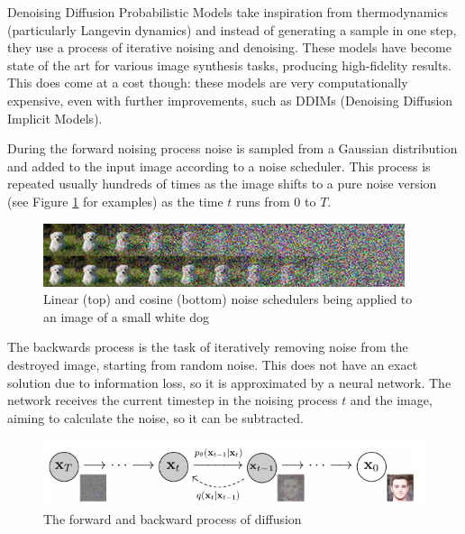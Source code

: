 	Denoising Diffusion Probabilistic Models take inspiration from thermodynamics (particularly Langevin dynamics\cite{welling2011bayesian}) and instead of generating a sample in one step, they use a process of iterative noising and denoising\cite{ho2020denoising}. These models have become state of the art for various image synthesis tasks, producing high-fidelity results. This does come at a cost though: these models are very computationally expensive, even with further improvements, such as DDIMs (Denoising Diffusion Implicit Models\cite{song2020denoising}).
	
	During the forward noising process noise is sampled from a Gaussian distribution and added to the input image according to a noise scheduler. This process is repeated usually hundreds of times as the image shifts to a pure noise version (see Figure \ref{fig:scheduler} for examples) as the time $t$ runs from 0 to $T$.
	
	\begin{figure}[!h]
		\label{fig:scheduler}
		\centering
		\includegraphics[width=\textwidth]{figures/scheduler.png}
		\caption{Linear (top) and cosine (bottom) noise schedulers being applied to an image of a small white dog \cite{nichol2021improved}}
	\end{figure}
	
	
	The backwards process is the task of iteratively removing noise from the destroyed image, starting from random noise. This does not have an exact solution due to information loss, so it is approximated by a neural network. The network receives the current timestep in the noising process $t$ and the image, aiming to calculate the noise, so it can be subtracted.
	
	\begin{figure}[!h]
		\centering
		\includegraphics[width=\textwidth]{figures/diffusion.png}
		\caption{The forward and backward process of diffusion\cite{ho2020denoising}}
	\end{figure}
	
